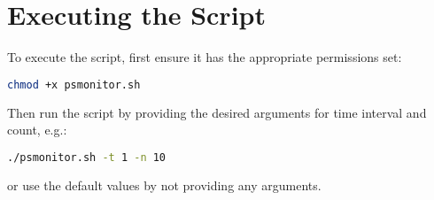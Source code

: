 \documentclass{article}
\begin{document}
\section{Executing the Script}
To execute the script, first ensure it has the appropriate permissions set:
\begin{lstlisting}[language=bash]
chmod +x psmonitor.sh
\end{lstlisting}
Then run the script by providing the desired arguments for time interval and count, e.g.:
\begin{lstlisting}[language=bash]
./psmonitor.sh -t 1 -n 10
\end{lstlisting}
 or use the default values by not providing any arguments.
\end{document}
